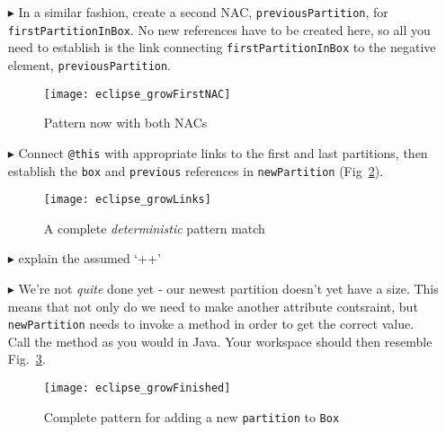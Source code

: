\begin{itemize}
\vspace{0.5cm}

\item[$\blacktriangleright$] In a similar fashion, create a second NAC, \texttt{previousPartition}, for \texttt{firstPartitionInBox}. No new references have to
be created here, so all you need to establish is the link connecting \texttt{firstPartitionInBox} to the negative element, \texttt{previousPartition}.

\begin{figure}[htp]
\begin{center}
  \texttt{[image: eclipse\_growFirstNAC]}
  \caption{Pattern now with both NACs}
  \label{fig:growPatt}
\end{center}
\end{figure}

\clearpage

\item[$\blacktriangleright$] Connect \texttt{@this} with appropriate links to the first and last partitions, then establish the \texttt{box} and
\texttt{previous} references in \texttt{newPartition} (Fig~\ref{fig:growAllLinks}).

\vspace{0.5cm}

\begin{figure}[htp]
\begin{center}
  \texttt{[image: eclipse\_growLinks]}
  \caption{A complete \emph{deterministic} pattern match}
  \label{fig:growAllLinks}
\end{center}
\end{figure}

\item[$\blacktriangleright$] \update explain the assumed `++'

\item[$\blacktriangleright$] We're not \emph{quite} done yet - our newest partition doesn't yet have a size. This means that not only do we need to make
another attribute contsraint, but \texttt{newPartition} needs to invoke a method in order to get the correct value. Call the method as you would in Java. 
Your workspace should then resemble Fig.~\ref{fig:patternComplete}.

\begin{figure}[htp]
\begin{center}
  \texttt{[image: eclipse\_growFinished]}
  \caption{Complete pattern for adding a new \texttt{partition} to \texttt{Box}}
  \label{fig:patternComplete}
\end{center}
\end{figure}


\end{itemize}
